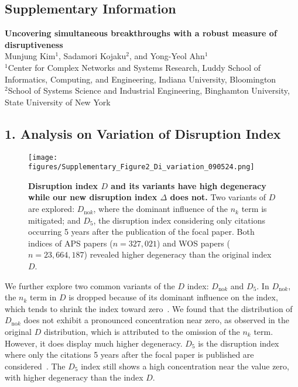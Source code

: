 \documentclass[12pt]{article}
\newcommand{\Dnok}{D_{\text{no}k}}
\begin{document}
\begin{refsection}

\newpage
\makeatletter
\def\fnum@figure{\figurename\thefigure}
\makeatother
\setcounter{figure}{0}    
\renewcommand{\figurename}{Supplementary Figure }


\section*{\centering Supplementary Information}
\begin{center}
    {\Large \textbf{Uncovering simultaneous breakthroughs with a robust measure of disruptiveness}} \\[0.5cm]
    \normalsize
    Munjung Kim$^{1}$, Sadamori Kojaku$^{2}$, and Yong-Yeol Ahn$^{1}$ \\[0.3cm]
    $^{1}$Center for Complex Networks and Systems Research, Luddy School of Informatics, Computing, and Engineering,
Indiana University, Bloomington \\
    $^{2}$School of Systems Science and Industrial
Engineering, Binghamton University, State University of New York \\
\end{center}

\label{suppinfo}
\subsection*{1. Analysis on Variation of Disruption Index}
\label{suppinfo:variation}
\begin{figure}[htbp]
    \centering
    \texttt{[image: figures/Supplementary\_Figure2\_Di\_variation\_090524.png]}
    \caption{  
    \textbf{Disruption index $D$ and its variants have high degeneracy while our new disruption index $\Delta$ does not.} Two variants of $D$ are explored: $\Dnok$, where the dominant influence of the $n_k$ term is mitigated; and $D_{5}$, the disruption index considering only citations occurring 5 years after the publication of the focal paper. Both indices of APS papers ($n =327,021$) and WOS papers ($n=23,664,187$) revealed higher degeneracy than the original index $D$.  }
\label{fig:sup_distribution_disruption}
\end{figure}



We further explore two common variants of the $D$ index: $\Dnok$ and $D_{5}$. In $\Dnok$, the $n_k$ term in $D$ is dropped because of its dominant influence on the index, which tends to shrink the index toward zero~\cite{wu2019solo}. We found that the distribution of $\Dnok$  does not exhibit a pronounced concentration near zero, as observed in the original $D$ distribution, which is attributed to the omission of the $n_k$ term. However, it does display much higher degeneracy. $D_5$ is the disruption index where only the citations 5 years after the focal paper is published are considered~\cite{park2023papers}. The $D_5$ index still shows a high concentration near the value zero, with higher degeneracy than the index $D$. 



\end{refsection}
\end{document}
